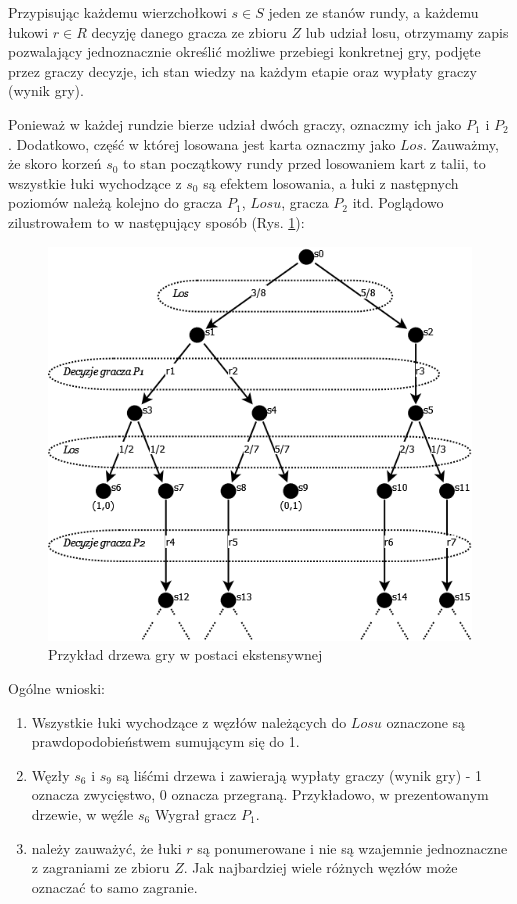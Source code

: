 Przypisując każdemu wierzchołkowi $s \in S$ jeden ze stanów rundy, a każdemu łukowi $r \in R$ decyzję danego gracza ze zbioru $Z$ lub udział losu, otrzymamy zapis pozwalający jednoznacznie określić możliwe przebiegi konkretnej gry, podjęte przez graczy decyzje, ich stan wiedzy na każdym etapie oraz wypłaty graczy (wynik gry).

Ponieważ w każdej rundzie bierze udział dwóch graczy, oznaczmy ich jako $P_1$ i $P_2$. Dodatkowo, część w której losowana jest karta oznaczmy jako $Los$. Zauważmy, że skoro korzeń $s_0$ to stan początkowy rundy przed losowaniem kart z talii, to wszystkie łuki wychodzące z $s_0$ są efektem losowania, a łuki z następnych poziomów należą kolejno do gracza $P_1$, $Losu$, gracza $P_2$ itd. Poglądowo zilustrowałem to w następujący sposób (Rys. \ref{fig:drzewo}):

\begin{figure}[h]
	\centering
	\includegraphics[scale=0.5]{Resources/drzewo2.png}
	\caption{Przykład drzewa gry w postaci ekstensywnej} 
	\label{fig:drzewo}
\end{figure}
Ogólne wnioski:
\begin{enumerate}
	\item Wszystkie łuki wychodzące z węzłów należących do $Losu$ oznaczone są prawdopodobieństwem sumującym się do 1.
	\item Węzły $s_6$ i $s_9$ są liśćmi drzewa i zawierają wypłaty graczy  (wynik gry) - 1 oznacza zwycięstwo, 0 oznacza przegraną. Przykładowo, w prezentowanym drzewie, w węźle $s_6$ Wygrał gracz $P_1$.
	\item należy zauważyć, że łuki $r$ są ponumerowane i nie są wzajemnie jednoznaczne z zagraniami ze zbioru $Z$. Jak najbardziej wiele różnych węzłów może oznaczać to samo zagranie.
\end{enumerate}

